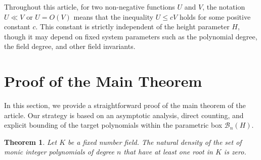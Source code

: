 \documentclass[11pt,a4paper]{article}
\newtheorem{theorem}{Theorem}[section]
\begin{document}
Throughout this article, for two non-negative functions $U$ and $V$, the notation $U \ll V$ or $U = O(V)$ means that the inequality $U \le cV$ holds for some positive constant $c$. This constant is strictly independent of the height parameter $H$, though it may depend on fixed system parameters such as the polynomial degree, the field degree, and other field invariants.\section{Proof of the Main Theorem}
In this section, we provide a straightforward proof of the main theorem of the article. Our strategy is based on an asymptotic analysis, direct counting, and explicit bounding of the target polynomials within the parametric box $\mathcal{B}_n(H)$.

\begin{theorem}\label{thm:main}
Let $K$ be a fixed number field. The natural density of the set of monic integer polynomials of degree $n$ that have at least one root in $K$ is zero.
\end{theorem}
\end{document}
